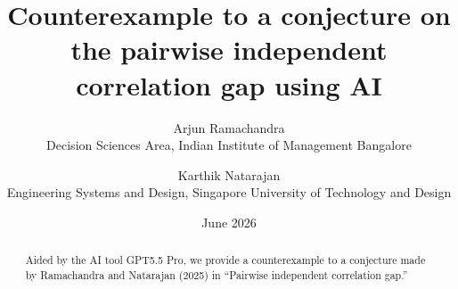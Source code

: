 \title{Counterexample to a conjecture on the pairwise independent correlation gap using AI}
\author{Arjun Ramachandra\\
Decision Sciences Area, Indian Institute of Management Bangalore
\and
Karthik Natarajan\\
Engineering Systems and Design, Singapore University of Technology and Design}
\date{June 2026}
\maketitle

\begin{abstract}
Aided by the AI tool GPT5.5 Pro, we provide a counterexample to a
conjecture made by Ramachandra and Natarajan (2025) in ``Pairwise independent
correlation gap.''
\end{abstract}
